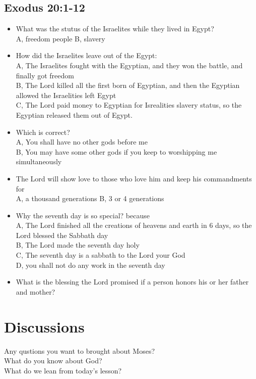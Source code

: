 \subsection{Exodus 20:1-12}
\large
\begin{itemize}
\item What was the stutus of the Israelites while they lived in Egypt?\\
A, freedom people \hspace{1cm}  B, slavery
\item How did the Israelites leave out of the Egypt: \\
A, The Israelites fought with the Egyptian, and they won the battle, and finally got freedom \\
B, The Lord killed all the first born of Egyptian, and then the Egyptian allowed the Israelities left Egypt\\
C, The Lord paid money to Egyptian for Isrealities slavery status, so the Egyptian released them out of Egypt.
\item Which is correct?\\
A, You shall have no other gods before me \\
B, You may have some other gods if you keep to worshipping me simultaneously
\item The Lord will show love to those who love him and keep his commandments for\\
A, a thousand generations  \hspace{1cm} B, 3 or 4 generations
\item Why the seventh day is so special? because\\
A, The Lord finished all the creations of heavens and earth in 6 days, so the Lord blessed the Sabbath day\\
B, The Lord made the seventh day holy\\
C, The seventh day is a sabbath to the Lord your God\\
D, you shall not do any work in the seventh day
\item What is the blessing the Lord promised if a person honors his or her father and mother?
\end{itemize}

\section{Discussions}
\large
Any qustions you want to brought about Moses?\\
What do you know about God?\\
What do we lean from today's lesson?

\normalsize
